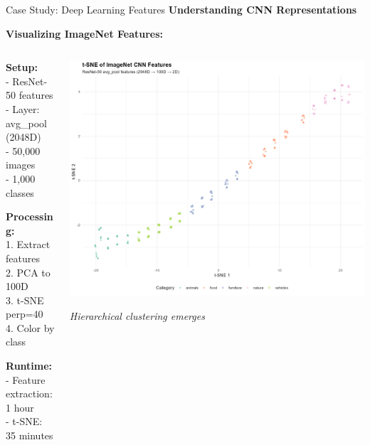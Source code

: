 \documentclass[10pt]{beamer}
\newcommand{\emphtext}[1]{\textcolor{upcblue}{\textbf{#1}}}
\begin{document}
\begin{frame}{Case Study: Deep Learning Features}
\emphtext{Understanding CNN Representations}

\vspace{0.3cm}
\textbf{Visualizing ImageNet Features:}

\begin{columns}[T]
\begin{column}{0.48\textwidth}
\footnotesize
\textbf{Setup:}\\
- ResNet-50 features\\
- Layer: avg\_pool (2048D)\\
- 50,000 images\\
- 1,000 classes

\vspace{0.2cm}
\textbf{Processing:}\\
1. Extract features\\
2. PCA to 100D\\
3. t-SNE perp=40\\
4. Color by class

\vspace{0.2cm}
\textbf{Runtime:}\\
- Feature extraction: 1 hour\\
- t-SNE: 35 minutes
\end{column}

\begin{column}{0.48\textwidth}
\begin{center}
\includegraphics[width=\linewidth]{./Figures/imagenet_tsne.png}
\end{center}
\footnotesize\textit{Hierarchical clustering emerges}
\end{column}
\end{columns}


\end{frame}
\end{document}
